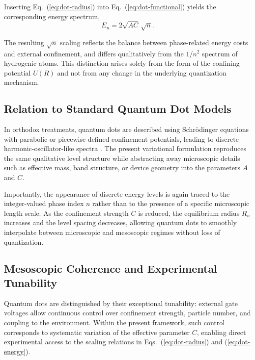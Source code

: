 \documentclass[11pt]{article}
\begin{document}
            Inserting Eq.~(\ref{eq:dot-radius}) into Eq.~(\ref{eq:dot-functional}) yields the corresponding energy spectrum,
            \begin{equation}
                E_n = 2\sqrt{A C}\,\sqrt{n}.
                \label{eq:dot-energy}
            \end{equation}

            The resulting $\sqrt{n}$ scaling reflects the balance between phase-related energy costs and external confinement, and differs qualitatively from the $1/n^2$ spectrum of hydrogenic atoms. This distinction arises solely from the form of the confining potential $U(R)$ and not from any change in the underlying quantization mechanism.

        \subsection{Relation to Standard Quantum Dot Models}

            In orthodox treatments, quantum dots are described using Schr\"odinger equations with parabolic or piecewise-defined confinement potentials, leading to discrete harmonic-oscillator-like spectra \cite{ReimannManninen2002}. The present variational formulation reproduces the same qualitative level structure while abstracting away microscopic details such as effective mass, band structure, or device geometry into the parameters $A$ and $C$.

            Importantly, the appearance of discrete energy levels is again traced to the integer-valued phase index $n$ rather than to the presence of a specific microscopic length scale. As the confinement strength $C$ is reduced, the equilibrium radius $R_n$ increases and the level spacing decreases, allowing quantum dots to smoothly interpolate between microscopic and mesoscopic regimes without loss of quantization.

        \subsection{Mesoscopic Coherence and Experimental Tunability}

            Quantum dots are distinguished by their exceptional tunability: external gate voltages allow continuous control over confinement strength, particle number, and coupling to the environment. Within the present framework, such control corresponds to systematic variation of the effective parameter $C$, enabling direct experimental access to the scaling relations in Eqs.~(\ref{eq:dot-radius}) and (\ref{eq:dot-energy}).
\end{document}
